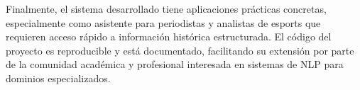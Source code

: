 Finalmente, el sistema desarrollado tiene aplicaciones prácticas concretas, especialmente como asistente para periodistas y analistas de esports que requieren acceso rápido a información histórica estructurada. El código del proyecto es reproducible y está documentado, facilitando su extensión por parte de la comunidad académica y profesional interesada en sistemas de NLP para dominios especializados.

